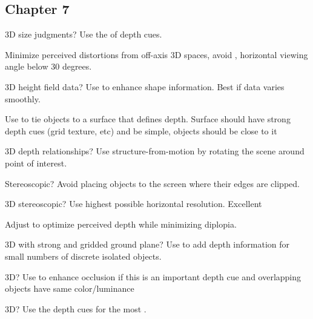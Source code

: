 



\subsection{Chapter 7}


\begin{compactenum}

\item 3D size judgments? Use the  of depth cues.

\item Minimize perceived distortions from off-axis 3D spaces, avoid , horizontal viewing angle below 30 degrees.

\item 3D height field data? Use  to enhance shape information.
    Best if data varies smoothly.

\item Use  to tie objects to a surface that defines depth. Surface
    should have strong depth cues (grid texture, etc) and be simple, objects
    should be close to it

\item 3D depth relationships? Use structure-from-motion by rotating the scene
    around point of interest.

\item Stereoscopic? Avoid placing objects  to the screen where their
    edges are clipped.

\item 3D stereoscopic? Use highest possible horizontal resolution. Excellent

\item Adjust  to optimize perceived depth while
    minimizing diplopia.

\item 3D with strong and gridded ground plane? Use  to add depth
    information for small numbers of discrete isolated objects.

\item 3D? Use  to enhance occlusion if this is an important depth cue and
    overlapping objects have same color/luminance

\item 3D? Use the depth cues for the most .


\end{compactenum}
